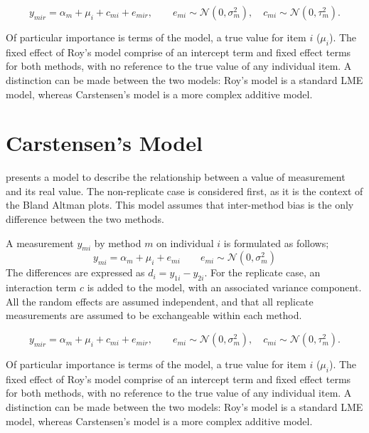 \documentclass[12pt, a4paper]{report}
\theoremstyle{plain}
\theoremstyle{definition}
\theoremstyle{remark}
\begin{document}
	\begin{equation}
		y_{mir}  = \alpha_{m} + \mu_{i} + c_{mi} + e_{mir}, \qquad  e_{mi}
		\sim \mathcal{N}(0,\sigma^{2}_{m}), \quad c_{mi} \sim \mathcal{N}(0,\tau^{2}_{m}).
	\end{equation}
	
	Of particular importance is terms of the model, a true value for item $i$ ($\mu_{i}$).  The fixed effect of Roy's model comprise of an intercept term and fixed effect terms for both methods, with no reference to the true value of any individual item. A distinction can be made between the two models: Roy's model is a standard LME model, whereas Carstensen's model is a more complex additive model.
	
	\bigskip
	\section{Carstensen's Model}
	
	
	
	\citet{BXC2004} presents a model to describe the relationship between a value of measurement and its
	real value. The non-replicate case is considered first, as it is the context of the Bland Altman plots. This model assumes that inter-method bias is the only difference between the two methods.
	
	A measurement $y_{mi}$ by method $m$ on individual $i$ is formulated as follows;
	\begin{equation}
	y_{mi}  = \alpha_{m} + \mu_{i} + e_{mi} \qquad  e_{mi} \sim
	\mathcal{N}(0,\sigma^{2}_{m})
	\end{equation}
	The differences are expressed as $d_{i} = y_{1i} - y_{2i}$. For the replicate case, an interaction term $c$ is added to the model, with an associated variance component. All the random effects are assumed independent, and that all replicate measurements are assumed to be exchangeable within each method.
	
	\begin{equation}
	y_{mir}  = \alpha_{m} + \mu_{i} + c_{mi} + e_{mir}, \qquad  e_{mi}
	\sim \mathcal{N}(0,\sigma^{2}_{m}), \quad c_{mi} \sim \mathcal{N}(0,\tau^{2}_{m}).
	\end{equation}
	
	Of particular importance is terms of the model, a true value for item $i$ ($\mu_{i}$).  The fixed effect of Roy's model comprise of an intercept term and fixed effect terms for both methods, with no reference to the true value of any individual item. A distinction can be made between the two models: Roy's model is a standard LME model, whereas Carstensen's model is a more complex additive model.
	
\end{document}

